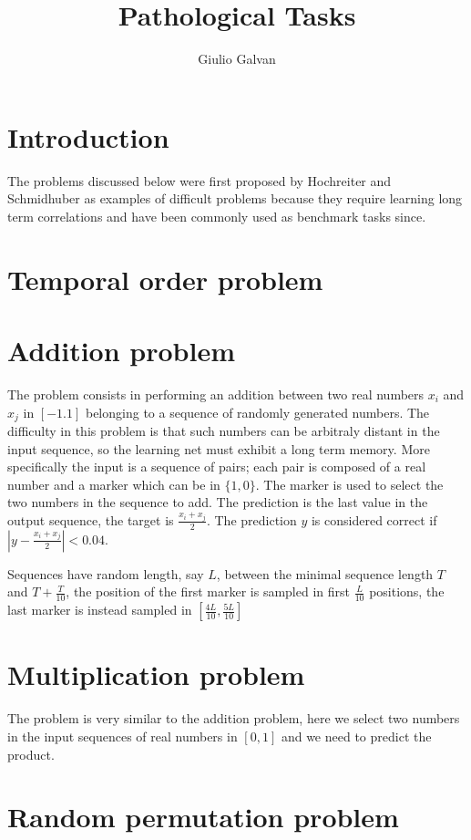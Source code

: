 \documentclass{article}
\title{ Pathological Tasks}
\author{Giulio Galvan}
\begin{document}
\maketitle

\begin{abstract}
\end{abstract}

\section{Introduction}
The problems discussed below were first proposed by Hochreiter and Schmidhuber\cite{Hochreiter95longshort-term} as examples of difficult problems because they require learning long term correlations and have
been commonly used as benchmark tasks since.

\section{Temporal order problem}
\section{Addition problem}
The problem consists in performing an addition between two real numbers $x_i$ and $x_j$ in $[-1.1]$ belonging to a sequence of randomly generated numbers. The difficulty in this problem is that such numbers can be arbitraly
distant in the input sequence, so the learning net must exhibit a long term memory. More specifically the input is a sequence of pairs; each pair is composed of a real number and a marker which can be in
$\{1,0\}$. The marker is used to select the two numbers in the sequence to add. The prediction is the last value in the output sequence, the target is $\frac{x_i+x_j}{2}$. The prediction $y$ is considered correct
if $|y-\frac{x_i+x_j}{2}| < 0.04$.

Sequences have random length, say $L$, between the minimal sequence length $T$ and $T+\frac{T}{10}$, the position of the first marker is sampled in first $\frac{L}{10}$ positions, the last marker is
instead sampled in $[\frac{4L}{10},\frac{5L}{10}]$

\section{Multiplication problem}
The problem is very similar to the addition problem, here we select two numbers in the input sequences of real numbers in $[0,1]$ and we need to predict the product.

\section{Random permutation problem}






\newpage
\nocite{*}		 %
{}

\end{document}

